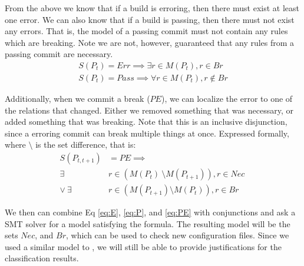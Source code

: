 From the above we know that if a build is erroring, then there must exist at least one error.
We can also know that if a build is passing, then there must not exist any errors.
That is, the model of a passing commit must not contain any rules which are breaking.
Note we are not, however, guaranteed that any rules from a passing commit are necessary.
\begin{align}
  S(P_t) = Err \implies \exists r \in  M (P_t), r \in Br \label{eq:E}\\
  S(P_t) = Pass \implies \forall r \in  M (P_t), r \notin Br \label{eq:P}
\end{align}

Additionally, when we commit a break ($PE$), we can localize the error to one of the relations that changed.
Either we removed something that was necessary, or added something that was breaking.
Note that this is an inclusive disjunction, since a erroring commit can break multiple things at once.
Expressed formally, where $\setminus$ is the set difference, that is:
\begin{align}
  S(P_{t,t+1}) &= PE \implies \nonumber \\
  \exists& r \in (M(P_{t})\ \setminus M(P_{t+1})), r \in Nec\ \nonumber \\
  \lor \ \exists& r \in (M(P_{t+1}) \setminus M(P_{t})), r \in Br \label{eq:PE}
\end{align}

We then can combine Eq \ref{eq:E}, \ref{eq:P}, and \ref{eq:PE} with
conjunctions and ask a SMT solver for a model satisfying the formula.
The resulting model will be the sets $Nec$, and $Br$, which can be used to check new configuration files.
Since we used a similar model to \app, we will still be able to provide justifications for the classification results.

